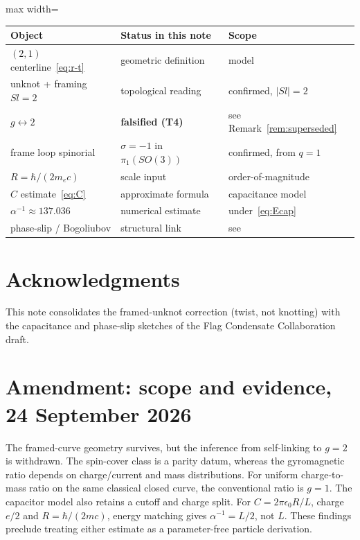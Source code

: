 \documentclass[11pt,a4paper]{article}
\begin{document}
\begin{center}
\begin{adjustbox}{max width=\linewidth}\begin{tabular}{@{}llp{}@{}}
\toprule
Object & Status in this note & Scope \\
\midrule
$(2,1)$ centerline~\eqref{eq:r-t} & geometric definition & model \\
unknot + framing $Sl=2$ & topological reading & confirmed, $|Sl|=2$ \\
$g\leftrightarrow 2$ & \textbf{falsified (T4)} & see Remark~\ref{rem:superseded} \\
frame loop spinorial & $\sigma=-1$ in $\pi_1(SO(3))$ & confirmed, from $q=1$ \\
$R=\hbar/(2m_ec)$ & scale input & order-of-magnitude \\
$C$ estimate~\eqref{eq:C} & approximate formula & capacitance model \\
$\alpha^{-1}\approx 137.036$ & numerical estimate & under~\eqref{eq:Ecap} \\
phase-slip / Bogoliubov & structural link & see~\cite{flagdecay2026} \\
\bottomrule
\end{tabular}\end{adjustbox}
\end{center}

\section*{Acknowledgments}
This note consolidates the framed-unknot correction (twist, not knotting)
with the capacitance and phase-slip sketches of the Flag Condensate
Collaboration draft.


\section*{Amendment: scope and evidence, 24 September 2026}
The framed-curve geometry survives, but the inference from self-linking to $g=2$ is withdrawn. The spin-cover class is a parity datum, whereas the gyromagnetic ratio depends on charge/current and mass distributions. For uniform charge-to-mass ratio on the same classical closed curve, the conventional ratio is $g=1$. The capacitor model also retains a cutoff and charge split. For $C=2\pi\epsilon_0R/L$, charge $e/2$ and $R=\hbar/(2mc)$, energy matching gives $\alpha^{-1}=L/2$, not $L$. These findings preclude treating either estimate as a parameter-free particle derivation.
\end{document}
